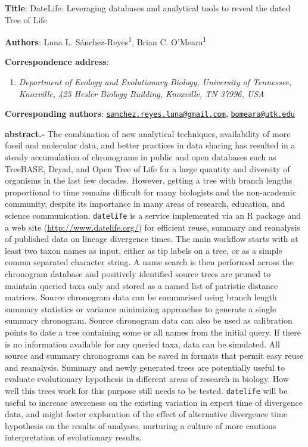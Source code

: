 \documentclass[]{article}
\title{}
\author{}
\date{}
\providecommand{\tightlist}{%
  \setlength{\itemsep}{0pt}\setlength{\parskip}{0pt}}
\begin{document}
\textbf{Title}: DateLife: Leveraging databases and analytical tools to reveal the dated Tree of Life

\textbf{Authors}: Luna L. Sánchez-Reyes\textsuperscript{1}, Brian C. O'Meara\textsuperscript{1}

\textbf{Correspondence address}:

\begin{enumerate}
\def\labelenumi{\arabic{enumi}.}
\tightlist
\item
  \emph{Department of Ecology and Evolutionary Biology, University of Tennessee, Knoxville, 425 Hesler Biology Building, Knoxville, TN 37996, USA}
\end{enumerate}

\textbf{Corresponding authors}: \href{mailto:sanchez.reyes.luna@gmail.com}{\nolinkurl{sanchez.reyes.luna@gmail.com}}, \href{mailto:bomeara@utk.edu}{\nolinkurl{bomeara@utk.edu}}

\newpage

\textbf{abstract.-}
The combination of new analytical techniques, availability of more fossil and molecular
data, and better practices in data sharing has resulted in a steady accumulation
of chronograms in public and open databases such as TreeBASE, Dryad, and Open Tree
of Life for a large quantity and diversity of organisms in the last few decades. However, getting a tree with branch lengths proportional to time remains difficult for many biologists and the non-academic community, despite its importance in many areas of research, education, and science communication. \texttt{datelife} is a service implemented via an R package and a web site
(\url{http://www.datelife.org/}) for efficient reuse, summary and reanalysis of published data on lineage divergence times. The main workflow starts with at least two taxon names as input, either as tip labels on a tree, or as a simple comma separated character string. A name search is then performed across the chronogram database and positively identified source trees are pruned to maintain queried taxa only and stored as a named list of patristic distance matrices. Source chronogram data can be summarised using branch length summary statistics or variance minimizing approaches to generate a single summary chronogram. Source chronogram data can also be used as calibration points to date a tree containing some or all names from the initial query. If there is no information available for any queried taxa, data can be simulated. All source and summary chronograms can be saved in formats that permit easy reuse and reanalysis. Summary and newly generated trees are potentially useful to evaluate evolutionary hypothesis in different areas of research in biology. How well this trees work for this purpose still needs to be tested. \texttt{datelife} will be useful to increase awereness on the existing variation in expert time of divergence data, and might foster exploration of the effect of alternative divergence time hypothesis on the results of analyses, nurturing a culture of more cautious interpretation of evolutionary results.
\end{document}
